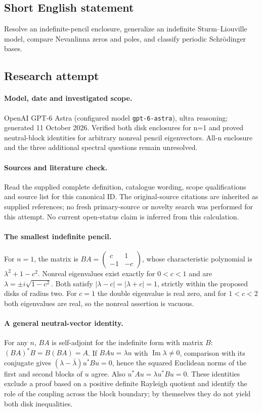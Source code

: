 \documentclass[11pt]{article}
\begin{document}
\subsection{Short English statement}
Resolve an indefinite-pencil enclosure, generalize an indefinite Sturm–Liouville model, compare Nevanlinna zeros and poles, and classify periodic Schrödinger bases.
\subsection{Research attempt}
\paragraph{Model, date and investigated scope.}
OpenAI GPT-6 Astra (configured model \texttt{gpt-6-astra}), ultra reasoning; generated 11 October 2026. Verified both disk enclosures for n=1 and proved neutral-block identities for arbitrary nonreal pencil eigenvectors. All-n enclosure and the three additional spectral questions remain unresolved.

\paragraph{Sources and literature check.}
Read the supplied complete definition, catalogue wording, scope qualifications and source list for this canonical ID. The original-source citations are inherited as supplied references; no fresh primary-source or novelty search was performed for this attempt. No current open-status claim is inferred from this calculation.

\paragraph{The smallest indefinite pencil.}For \(n=1\), the matrix is \(BA=\begin{pmatrix}c&1\\-1&-c\end{pmatrix}\), whose characteristic polynomial is \(\lambda^2+1-c^2\). Nonreal eigenvalues exist exactly for \(0<c<1\) and are \(\lambda=\pm i\sqrt{1-c^2}\). Both satisfy \(|\lambda-c|=|\lambda+c|=1\), strictly within the proposed disks of radius two. For \(c=1\) the double eigenvalue is real zero, and for \(1<c<2\) both eigenvalues are real, so the nonreal assertion is vacuous.
\paragraph{A general neutral-vector identity.}For any \(n\), \(BA\) is self-adjoint for the indefinite form with matrix \(B\): \((BA)^*B=B(BA)=A\). If \(BAu=\lambda u\) with \(\operatorname{Im}\lambda\ne0\), comparison with its conjugate gives \((\lambda-\bar\lambda)u^*Bu=0\), hence the squared Euclidean norms of the first and second blocks of \(u\) agree. Also \(u^*Au=\lambda u^*Bu=0\). These identities exclude a proof based on a positive definite Rayleigh quotient and identify the role of the coupling across the block boundary; by themselves they do not yield both disk inequalities.
\end{document}
